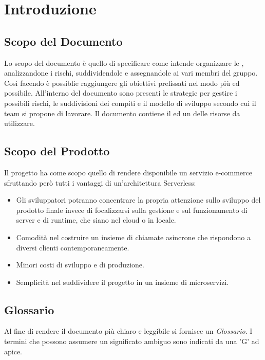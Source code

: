 \section{Introduzione}
\label{introduzione}
\subsection{Scopo del Documento}
Lo scopo del documento è quello di specificare come {\Gruppo} intende organizzare le , analizzandone i rischi, suddividendole e assegnandole ai vari membri del gruppo. Così facendo è possiblie raggiungere gli obiettivi prefissati nel modo più  ed  possibile. All'interno del documento sono presenti le strategie per gestire i possibili rischi, le suddivisioni dei compiti e il modello di sviluppo secondo cui il team si propone di lavorare. Il documento contiene il  ed un  delle risorse da utilizzare.

\subsection{Scopo del Prodotto} %
Il progetto {\NomeProgetto} ha come scopo quello di rendere disponibile un servizio e-commerce sfruttando però tutti i vantaggi di un'architettura Serverless:
\begin{itemize}
    \item Gli sviluppatori potranno concentrare la propria attenzione sullo sviluppo del prodotto finale invece di focalizzarsi sulla gestione e sul funzionamento di server e di runtime, che siano nel cloud o in locale.
    \item Comodità nel costruire un insieme di chiamate asincrone che rispondono a diversi clienti contemporaneamente.
    \item Minori costi di sviluppo e di produzione.
    \item Semplicità nel suddividere il progetto in un insieme di microservizi.
\end{itemize}

\subsection{Glossario}
Al fine di rendere il documento più chiaro e leggibile si fornisce un \textit{Glossario}. I termini che possono assumere un significato ambiguo sono indicati da una 'G' ad apice.


